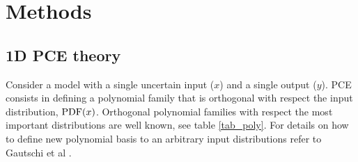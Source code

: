 \documentclass[preprint,12pt]{elsarticle}
\begin{document}
\section{Methods}
\label{sec_Methods}

\subsection{1D PCE theory}


Consider a model with a single uncertain input ($x$) and a single output ($y$). PCE consists in defining a polynomial family that is orthogonal with respect the input distribution, $\mathrm{PDF}(x)$. Orthogonal polynomial families with respect the most important distributions are well known, see table \ref{tab_poly}. For details on how to define new polynomial basis to an arbitrary input distributions refer to Gautschi et al \cite{gautschi1994algorithm}.

\begin{table}[h!]
\begin{center}
\caption{Classical orthogonal polynomial families.}
\label{tab_poly}
\end{center}
\end{table}



\end{document}
